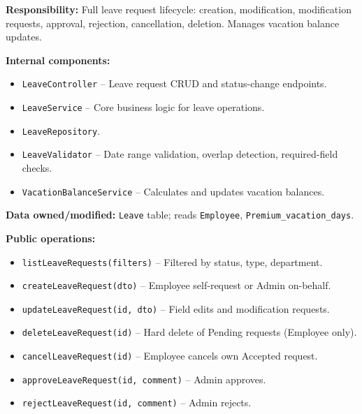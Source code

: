\documentclass[11pt,a4paper]{article}
\begin{document}
\textbf{Responsibility:} Full leave request lifecycle: creation, modification, modification requests, approval, rejection, cancellation, deletion. Manages vacation balance updates.

\textbf{Internal components:}
\begin{itemize}[leftmargin=1.5em]
    \item \texttt{LeaveController} -- Leave request CRUD and status-change endpoints.
    \item \texttt{LeaveService} -- Core business logic for leave operations.
    \item \texttt{LeaveRepository}.
    \item \texttt{LeaveValidator} -- Date range validation, overlap detection, required-field checks.
    \item \texttt{VacationBalanceService} -- Calculates and updates vacation balances.
\end{itemize}

\textbf{Data owned/modified:} \texttt{Leave} table; reads \texttt{Employee}, \texttt{Premium\_vacation\_days}.

\textbf{Public operations:}
\begin{itemize}[leftmargin=1.5em]
    \item \texttt{listLeaveRequests(filters)} -- Filtered by status, type, department.
    \item \texttt{createLeaveRequest(dto)} -- Employee self-request or Admin on-behalf.
    \item \texttt{updateLeaveRequest(id, dto)} -- Field edits and modification requests.
    \item \texttt{deleteLeaveRequest(id)} -- Hard delete of Pending requests (Employee only).
    \item \texttt{cancelLeaveRequest(id)} -- Employee cancels own Accepted request.
    \item \texttt{approveLeaveRequest(id, comment)} -- Admin approves.
    \item \texttt{rejectLeaveRequest(id, comment)} -- Admin rejects.
\end{itemize}
\end{document}
